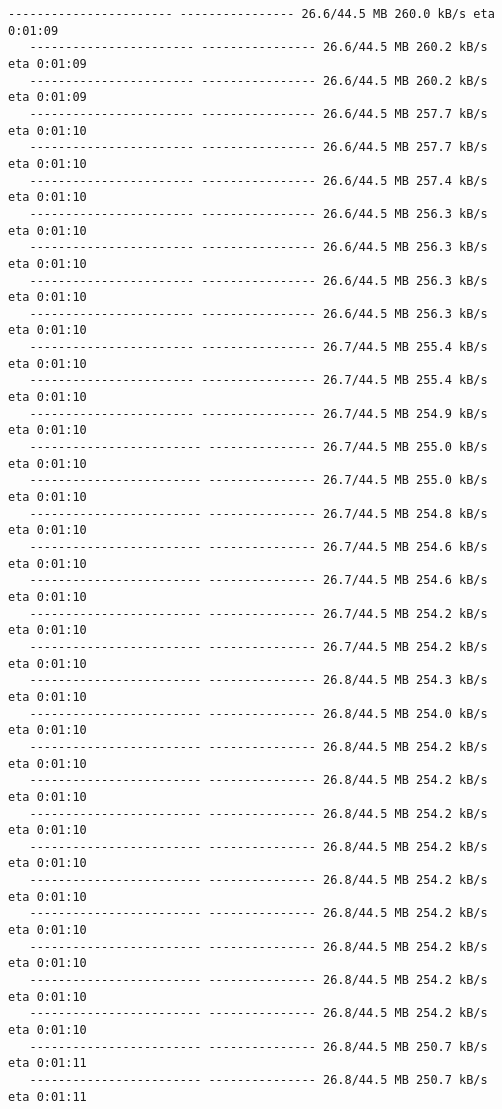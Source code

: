\documentclass[11pt]{article}
\begin{document}
\begin{Verbatim}[commandchars=\\\{\}]
   ----------------------- ---------------- 26.6/44.5 MB 260.0 kB/s eta 0:01:09
   ----------------------- ---------------- 26.6/44.5 MB 260.2 kB/s eta 0:01:09
   ----------------------- ---------------- 26.6/44.5 MB 260.2 kB/s eta 0:01:09
   ----------------------- ---------------- 26.6/44.5 MB 257.7 kB/s eta 0:01:10
   ----------------------- ---------------- 26.6/44.5 MB 257.7 kB/s eta 0:01:10
   ----------------------- ---------------- 26.6/44.5 MB 257.4 kB/s eta 0:01:10
   ----------------------- ---------------- 26.6/44.5 MB 256.3 kB/s eta 0:01:10
   ----------------------- ---------------- 26.6/44.5 MB 256.3 kB/s eta 0:01:10
   ----------------------- ---------------- 26.6/44.5 MB 256.3 kB/s eta 0:01:10
   ----------------------- ---------------- 26.6/44.5 MB 256.3 kB/s eta 0:01:10
   ----------------------- ---------------- 26.7/44.5 MB 255.4 kB/s eta 0:01:10
   ----------------------- ---------------- 26.7/44.5 MB 255.4 kB/s eta 0:01:10
   ----------------------- ---------------- 26.7/44.5 MB 254.9 kB/s eta 0:01:10
   ------------------------ --------------- 26.7/44.5 MB 255.0 kB/s eta 0:01:10
   ------------------------ --------------- 26.7/44.5 MB 255.0 kB/s eta 0:01:10
   ------------------------ --------------- 26.7/44.5 MB 254.8 kB/s eta 0:01:10
   ------------------------ --------------- 26.7/44.5 MB 254.6 kB/s eta 0:01:10
   ------------------------ --------------- 26.7/44.5 MB 254.6 kB/s eta 0:01:10
   ------------------------ --------------- 26.7/44.5 MB 254.2 kB/s eta 0:01:10
   ------------------------ --------------- 26.7/44.5 MB 254.2 kB/s eta 0:01:10
   ------------------------ --------------- 26.8/44.5 MB 254.3 kB/s eta 0:01:10
   ------------------------ --------------- 26.8/44.5 MB 254.0 kB/s eta 0:01:10
   ------------------------ --------------- 26.8/44.5 MB 254.2 kB/s eta 0:01:10
   ------------------------ --------------- 26.8/44.5 MB 254.2 kB/s eta 0:01:10
   ------------------------ --------------- 26.8/44.5 MB 254.2 kB/s eta 0:01:10
   ------------------------ --------------- 26.8/44.5 MB 254.2 kB/s eta 0:01:10
   ------------------------ --------------- 26.8/44.5 MB 254.2 kB/s eta 0:01:10
   ------------------------ --------------- 26.8/44.5 MB 254.2 kB/s eta 0:01:10
   ------------------------ --------------- 26.8/44.5 MB 254.2 kB/s eta 0:01:10
   ------------------------ --------------- 26.8/44.5 MB 254.2 kB/s eta 0:01:10
   ------------------------ --------------- 26.8/44.5 MB 254.2 kB/s eta 0:01:10
   ------------------------ --------------- 26.8/44.5 MB 250.7 kB/s eta 0:01:11
   ------------------------ --------------- 26.8/44.5 MB 250.7 kB/s eta 0:01:11

\end{Verbatim}
\end{document}

